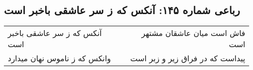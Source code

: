 \begin{center}
\section*{رباعی شماره ۱۴۵: آنکس که ز سر عاشقی باخبر است}
\label{sec:0145}
\begin{longtable}{l p{0.5cm} r}
آنکس که ز سر عاشقی باخبر است
&&
فاش است میان عاشقان مشتهر است
\\
وانکس که ز ناموس نهان میدارد
&&
پیداست که در فراق زیر و زبر است
\\
\end{longtable}
\end{center}
